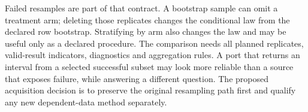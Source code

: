 Failed resamples are part of that contract. A bootstrap sample can omit a
treatment arm; deleting those replicates changes the conditional law from
the declared row bootstrap. Stratifying by arm also changes the law and may
be useful only as a declared procedure. The comparison needs all planned
replicates, valid-result indicators, diagnostics and aggregation rules.
A port that returns an interval from a selected successful subset may look
more reliable than a source that exposes failure, while answering a different
question. The proposed acquisition decision is to preserve the original
resampling path first and qualify any new dependent-data method separately.
